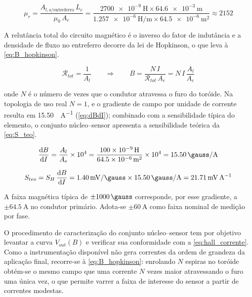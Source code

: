 \begin{equation}
\mu_r = \frac{A_{l,\text{s/entreferro}}\,L_e}{\mu_0\,A_e}
      = \frac{\SI{2700e-9}{\henry} \times \SI{64,6e-3}{\meter}}
             {\SI{1,257e-6}{\henry\per\meter} \times \SI{64,5e-6}{\meter\squared}}
      \approx 2152
\label{eq:mur}
\end{equation}

A relutância total do circuito magnético é o inverso do fator de indutância
e a densidade de fluxo no entreferro decorre da lei de Hopkinson, o que
leva à \autoref{eq:B_hopkinson}.

\begin{equation}
\mathcal{R}_{tot} = \frac{1}{A_l}
\qquad\Longrightarrow\qquad
B = \frac{N\,I}{\mathcal{R}_{tot}\,A_e} = N\,I\,\frac{A_l}{A_e}
\label{eq:B_hopkinson}
\end{equation}

\noindent
onde $N$ é o número de vezes que o condutor atravessa o furo do toróide. Na
topologia de uso real $N = 1$, e o gradiente de campo por unidade de
corrente resulta em \SI{15,50}{\gauss\per\ampere}
(\autoref{eq:dBdI}); combinado com a sensibilidade típica do elemento, o
conjunto núcleo--sensor apresenta a sensibilidade teórica da
\autoref{eq:S_teo}.

\begin{equation}
\frac{\mathrm{d}B}{\mathrm{d}I} = \frac{A_l}{A_e} \times 10^{4}
= \frac{\SI{100e-9}{\henry}}{\SI{64,5e-6}{\meter\squared}} \times 10^{4}
= \SI{15,50}{\gauss\per\ampere}
\label{eq:dBdI}
\end{equation}

\begin{equation}
S_{teo} = S_H\,\frac{\mathrm{d}B}{\mathrm{d}I}
= \SI{1,40}{\milli\volt\per\gauss} \times \SI{15,50}{\gauss\per\ampere}
= \SI{21,71}{\milli\volt\per\ampere}
\label{eq:S_teo}
\end{equation}

A faixa magnética típica de $\pm\SI{1000}{\gauss}$ corresponde, por esse
gradiente, a $\pm\SI{64,5}{\ampere}$ no condutor primário. Adota-se
$\pm\SI{60}{\ampere}$ como faixa nominal de medição por fase.

O procedimento de caracterização do conjunto núcleo--sensor tem por
objetivo levantar a curva $V_{out}(B)$ e verificar sua conformidade com a
\autoref{eq:hall_corrente}. Como a instrumentação disponível não gera
correntes da ordem de grandeza da aplicação final, recorre-se à
\autoref{eq:B_hopkinson}: enrolando $N$ espiras no toróide obtém-se o mesmo
campo que uma corrente $N$ vezes maior atravessando o furo uma única vez, o
que permite varrer a faixa de interesse do sensor a partir de correntes
modestas.

